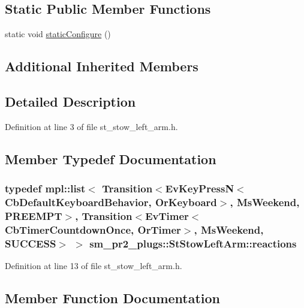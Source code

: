 \subsection*{Static Public Member Functions}
\begin{DoxyCompactItemize}
\item 
static void \hyperlink{structsm__pr2__plugs_1_1StStowLeftArm_a3075009fd893f157279494836e4af96d}{static\+Configure} ()
\end{DoxyCompactItemize}
\subsection*{Additional Inherited Members}


\subsection{Detailed Description}


Definition at line 3 of file st\+\_\+stow\+\_\+left\+\_\+arm.\+h.



\subsection{Member Typedef Documentation}
\subsubsection[{\texorpdfstring{reactions}{reactions}}]{\setlength{\rightskip}{0pt plus 5cm}typedef mpl\+::list$<$ Transition$<$Ev\+Key\+PressN$<$Cb\+Default\+Keyboard\+Behavior, {\bf Or\+Keyboard}$>$, {\bf Ms\+Weekend}, {\bf P\+R\+E\+E\+M\+PT}$>$, Transition$<$Ev\+Timer$<$Cb\+Timer\+Countdown\+Once, {\bf Or\+Timer}$>$, {\bf Ms\+Weekend}, {\bf S\+U\+C\+C\+E\+SS}$>$ $>$ {\bf sm\+\_\+pr2\+\_\+plugs\+::\+St\+Stow\+Left\+Arm\+::reactions}}\hypertarget{structsm__pr2__plugs_1_1StStowLeftArm_a571756481c6a56baae36fbef1ba400c5}{}\label{structsm__pr2__plugs_1_1StStowLeftArm_a571756481c6a56baae36fbef1ba400c5}


Definition at line 13 of file st\+\_\+stow\+\_\+left\+\_\+arm.\+h.



\subsection{Member Function Documentation}
